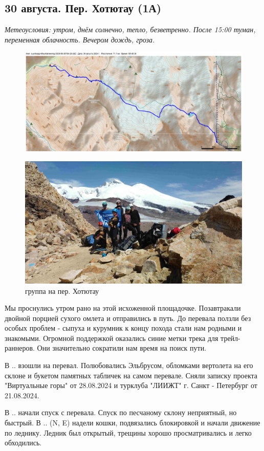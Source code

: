 \subsection{30 августа. Пер. Хотютау (1А)}
\textit{Метеоусловия: утром, днём солнечно, тепло, безветренно. После 15:00 туман, переменная облачность. Вечером дождь, гроза.}

\begin{figure}[h!]
	\centering
	\includegraphics[angle=0, width=0.3\linewidth]{../pics/mini_maps/30}
	\label{fig:mini_30}
\end{figure}




\begin{figure}[h!]
	\centering
	\includegraphics[width=0.7\linewidth]{../pics/DJI_0899}
	\caption{группа на пер. Хотютау}
	\label{fig:hotyutau_1}
\end{figure}

Мы проснулись утром рано на этой исхоженной площадочке. Позавтракали двойной порцией сухого омлета и отправились в путь.
До перевала ползли без особых проблем - сыпуха и курумник к концу похода стали нам родными и знакомыми. Огромной поддержкой оказались синие метки трека для трейл-раннеров. Они значительно сократили нам время на поиск пути.

В .. взошли на перевал. Полюбовались Эльбрусом, обломками вертолета на его склоне и букетом памятных табличек на самом перевале. Сняли записку проекта "Виртуальные горы" от 28.08.2024 и турклуба "ЛИИЖТ" г. Санкт - Петербург от 21.08.2024.

В .. начали спуск с перевала. Спуск по песчаному склону неприятный, но быстрый. В .. (N, E) надели кошки, подвязались блокировкой и начали движение по леднику. Ледник был открытый, трещины хорошо просматривались и легко обходились.

